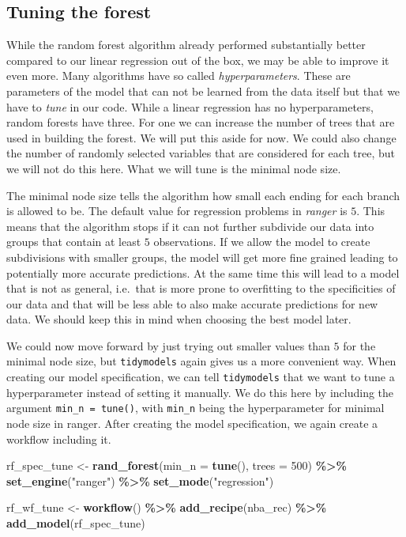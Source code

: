 \documentclass[
]{book}
\newenvironment{Shaded}{\begin{snugshade}}{\end{snugshade}}
\newcommand{\AttributeTok}[1]{\textcolor[rgb]{0.13,0.29,0.53}{#1}}
\newcommand{\DecValTok}[1]{\textcolor[rgb]{0.00,0.00,0.81}{#1}}
\newcommand{\FunctionTok}[1]{\textcolor[rgb]{0.13,0.29,0.53}{\textbf{#1}}}
\newcommand{\NormalTok}[1]{#1}
\newcommand{\OtherTok}[1]{\textcolor[rgb]{0.56,0.35,0.01}{#1}}
\newcommand{\SpecialCharTok}[1]{\textcolor[rgb]{0.81,0.36,0.00}{\textbf{#1}}}
\newcommand{\StringTok}[1]{\textcolor[rgb]{0.31,0.60,0.02}{#1}}
\begin{document}
\hypertarget{tuning-the-forest}{%
\subsection{Tuning the forest}\label{tuning-the-forest}}

While the random forest algorithm already performed substantially better
compared to our linear regression out of the box, we may be able to improve it
even more. Many algorithms have so called \emph{hyperparameters}. These are
parameters of the model that can not be learned from the data itself but that we
have to \emph{tune} in our code. While a linear regression has no hyperparameters,
random forests have three. For one we can increase the number of trees that are
used in building the forest. We will put this aside for now. We could also
change the number of randomly selected variables that are considered for each
tree, but we will not do this here. What we will tune is the minimal node size.

The minimal node size tells the algorithm how small each ending for each branch
is allowed to be. The default value for regression problems in \emph{ranger} is \(5\).
This means that the algorithm stops if it can not further subdivide our data
into groups that contain at least \(5\) observations. If we allow the model to
create subdivisions with smaller groups, the model will get more fine grained
leading to potentially more accurate predictions. At the same time this will
lead to a model that is not as general, i.e.~that is more prone to overfitting
to the specificities of our data and that will be less able to also make
accurate predictions for new data. We should keep this in mind when choosing
the best model later.

We could now move forward by just trying out smaller values than \(5\) for the
minimal node size, but \texttt{tidymodels} again gives us a more convenient way.
When creating our model specification, we can tell \texttt{tidymodels} that we want to
tune a hyperparameter instead of setting it manually. We do this here by
including the argument \texttt{min\_n\ =\ tune()}, with \texttt{min\_n} being the hyperparameter
for minimal node size in ranger. After creating the model specification, we
again create a workflow including it.

\begin{Shaded}
\begin{Highlighting}[]
\NormalTok{rf\_spec\_tune }\OtherTok{\textless{}{-}} \FunctionTok{rand\_forest}\NormalTok{(}\AttributeTok{min\_n =} \FunctionTok{tune}\NormalTok{(), }\AttributeTok{trees =} \DecValTok{500}\NormalTok{) }\SpecialCharTok{\%\textgreater{}\%} 
  \FunctionTok{set\_engine}\NormalTok{(}\StringTok{"ranger"}\NormalTok{) }\SpecialCharTok{\%\textgreater{}\%} 
  \FunctionTok{set\_mode}\NormalTok{(}\StringTok{"regression"}\NormalTok{)}

\NormalTok{rf\_wf\_tune }\OtherTok{\textless{}{-}} \FunctionTok{workflow}\NormalTok{() }\SpecialCharTok{\%\textgreater{}\%} 
  \FunctionTok{add\_recipe}\NormalTok{(nba\_rec) }\SpecialCharTok{\%\textgreater{}\%} 
  \FunctionTok{add\_model}\NormalTok{(rf\_spec\_tune)}
\end{Highlighting}
\end{Shaded}
\end{document}

